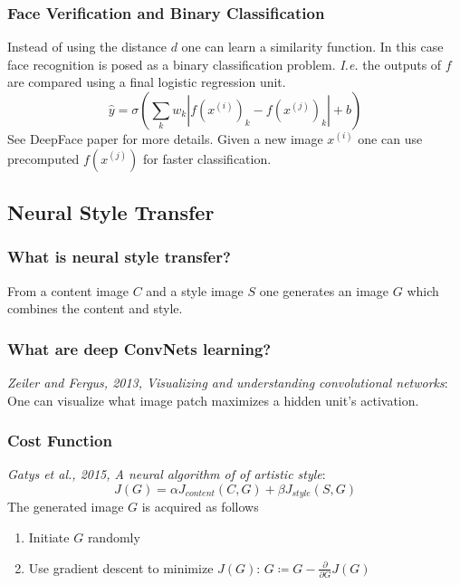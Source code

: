 \documentclass{article}
\begin{document}
\subsubsection{Face Verification and Binary Classification}
Instead of using the distance $d$ one can learn a similarity function.
In this case face recognition is posed as a binary classification problem.
\emph{I.e.} the outputs of $f$ are compared using a final logistic regression unit.
\begin{equation}
  \hat{y}=\sigma(\sum_kw_k|f(x^{(i)})_k-f(x^{(j)})_k|+b)
\end{equation}
See DeepFace paper for more details.
Given a new image $x^{(i)}$ one can use precomputed $f(x^{(j)})$ for faster classification.

\subsection{Neural Style Transfer}
\subsubsection{What is neural style transfer?}
From a content image $C$ and a style image $S$ one generates an image $G$ which combines the content and style.

\subsubsection{What are deep ConvNets learning?}
\emph{Zeiler and Fergus, 2013, Visualizing and understanding convolutional networks}:
One can visualize what image patch maximizes a hidden unit's activation.

\subsubsection{Cost Function}
\emph{Gatys et al., 2015, A neural algorithm of of artistic style}:
\begin{equation}
  J(G)=\alpha J_{content}(C, G)+\beta J_{style}(S, G)
\end{equation}
The generated image $G$ is acquired as follows
\begin{enumerate}
  \item Initiate $G$ randomly
  \item Use gradient descent to minimize $J(G)$: $G\coloneqq G-\frac{\partial}{\partial G}J(G)$
\end{enumerate}
\end{document}
